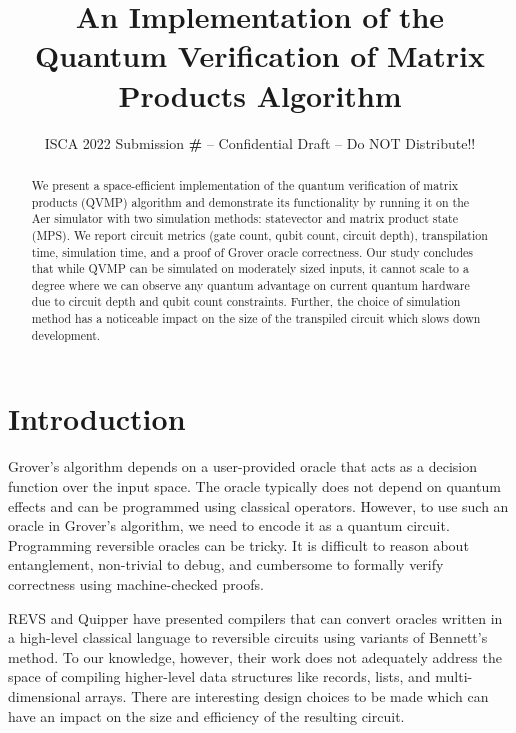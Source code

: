 \documentclass[conference]{IEEEtran}
\title{An Implementation of the Quantum Verification of Matrix Products Algorithm}
\author{\normalsize{ISCA 2022 Submission
    \textbf{\#\iscasubmissionnumber} -- Confidential Draft -- Do NOT Distribute!!}}
\begin{document}
\maketitle
\thispagestyle{plain}
\pagestyle{plain}




\begin{abstract}

  We present a space-efficient implementation of the quantum verification of
  matrix products (QVMP) algorithm and demonstrate its functionality by running
  it on the Aer simulator with two simulation methods: statevector and matrix
  product state (MPS). We report circuit metrics (gate count, qubit count,
  circuit depth), transpilation time, simulation time, and a proof of Grover
  oracle correctness.  Our study concludes that while QVMP can be simulated on
  moderately sized inputs, it cannot scale to a degree where we can observe any
  quantum advantage on current quantum hardware due to circuit depth and qubit
  count constraints. Further, the choice of simulation method has a noticeable
  impact on the size of the transpiled circuit which slows down development.

\end{abstract}

\section{Introduction}

  Grover's algorithm depends on a user-provided oracle that acts as a decision
  function over the input space. The oracle typically does not depend on quantum
  effects and can be programmed using classical operators. However, to use such
  an oracle in Grover's algorithm, we need to encode it as a quantum circuit.
  Programming reversible oracles can be tricky. It is difficult to reason about
  entanglement, non-trivial to debug, and cumbersome to formally verify
  correctness using machine-checked proofs.

  REVS \cite{amy2017verified} and Quipper \cite{green2013quipper} have presented
  compilers that can convert oracles written in a high-level classical language
  to reversible circuits using variants of Bennett's method.  To our knowledge,
  however, their work does not adequately address the space of compiling
  higher-level data structures like records, lists, and multi-dimensional
  arrays. There are interesting design choices to be made which can have an
  impact on the size and efficiency of the resulting circuit.
\end{document}
